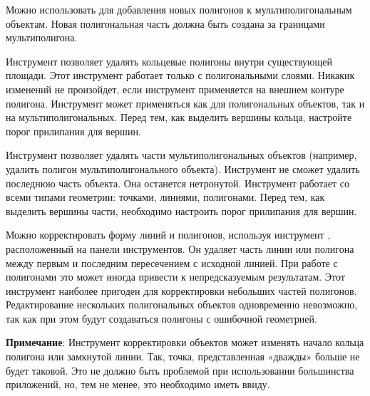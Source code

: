 
Можно использовать 
для добавления новых полигонов к мультиполигональным объектам. Новая
полигональная часть должна быть создана за границами мультиполигона.



Инструмент  позволяет удалять
кольцевые полигоны внутри существующей площади. Этот инструмент работает
только с полигональными слоями. Никакик изменений не произойдет, если
инструмент применяется на внешнем контуре полигона. Инструмент может
применяться как для полигональных объектов, так и на мультиполигональных.
Перед тем, как выделить вершины кольца, настройте порог прилипания для вершин.



Инструмент  позволяет удалять
части мультиполигональных объектов (например, удалить полигон
мультиполигонального объекта). Инструмент не сможет удалить последнюю часть
объекта. Она останется нетронутой. Инструмент работает со всеми типами
геометрии: точками, линиями, полигонами. Перед тем, как выделить вершины
части, необходимо настроить порог прилипания для вершин.


Можно корректировать форму линий и полигонов, используя инструмент
, расположенный на
панели инструментов. Он удаляет часть линии или полигона между первым и
последним пересечением с исходной линией. При работе с полигонами это
может иногда привести к непредсказуемым результатам. Этот инструмент
наиболее пригоден для корректировки небольших частей полигонов. Редактирование
нескольких  полигональных объектов одновременно невозможно, так как при этом
будут создаваться полигоны с ошибочной геометрией.

\textbf{Примечание}: Инструмент корректировки объектов может изменять начало
кольца полигона или замкнутой линии. Так, точка, представленная «дважды»
больше не будет таковой. Это не должно быть проблемой при использовании
большинства приложений, но, тем не менее, это необходимо иметь ввиду.


